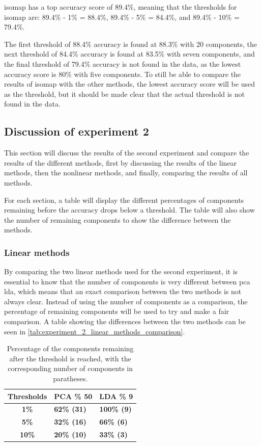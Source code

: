 isomap has a top accuracy score of 89.4\%, meaning that the thresholds for \gls{isomap}  are: 89.4\% - 1\% = 88.4\%, 89.4\% - 5\% = 84.4\%, and 89.4\% - 10\% = 79.4\%. 

The first threshold of 88.4\% accuracy is found at 88.3\% with 20 components, the next threshold of 84.4\% accuracy is found at 83.5\% with seven components, and the final threshold of 79.4\% accuracy is not found in the data, as the lowest accuracy score is 80\% with five components. To still be able to compare the results of \gls{isomap}  with the other methods, the lowest accuracy score will be used as the threshold, but it should be made clear that the actual threshold is not found in the data.


\subsection{Discussion of experiment 2}\label{subsec:experiment_2_discussion}
This section will discuss the results of the second experiment and compare the results of the different methods, first by discussing the results of the linear methods, then the nonlinear methods, and finally, comparing the results of all methods.

For each section, a table will display the different percentages of components remaining before the accuracy drops below a threshold. The table will also show the number of remaining components to show the difference between the methods.


\subsubsection{Linear methods}
By comparing the two linear methods used for the second experiment, it is essential to know that the number of components is very different between \gls{pca} \gls{lda}, which means that an exact comparison between the two methods is not always clear. Instead of using the number of components as a comparison, the percentage of remaining components will be used to try and make a fair comparison. A table showing the differences between the two methods can be seen in \autoref{tab:experiment_2_linear_methods_comparison}.

\begin{table}[htb!]
    \centering
    \begin{tabular}{cp{}p{}}
        \toprule
        \textbf{Thresholds} & \textbf{PCA \% 50} & \textbf{LDA \% 9} \\
        \midrule
        \textbf{1\%} & \textbf{62\% (31)} & \textbf{100\% (9)} \\
        \textbf{5\%} & \textbf{32\% (16)} & \textbf{66\% (6)} \\
        \textbf{10\%} & \textbf{20\% (10)} & \textbf{33\% (3)} \\
        \bottomrule
    \end{tabular}
    \caption{Percentage of the components remaining after the threshold is reached, with the corresponding number of components in paratheses.}
    \label{tab:experiment_2_linear_methods_comparison}
\end{table}


